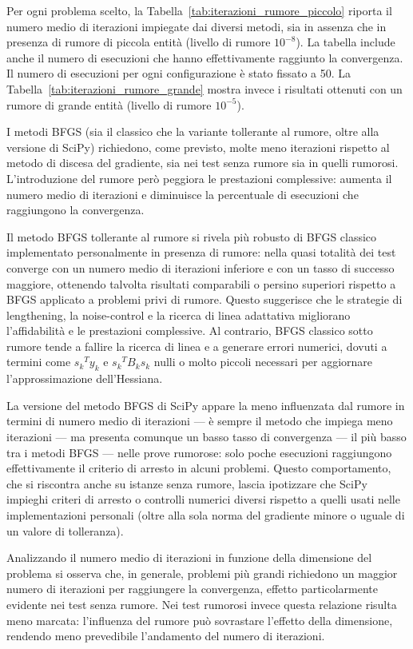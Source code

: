 Per ogni problema scelto, la Tabella~\ref{tab:iterazioni_rumore_piccolo} riporta il numero medio di iterazioni impiegate dai diversi metodi, sia in assenza che in presenza di rumore di piccola entità (livello di rumore \(10^{-8}\)). La tabella include anche il numero di esecuzioni che hanno effettivamente raggiunto la convergenza. Il numero di esecuzioni per ogni configurazione è stato fissato a 50. La Tabella~\ref{tab:iterazioni_rumore_grande} mostra invece i risultati ottenuti con un rumore di grande entità (livello di rumore \(10^{-5}\)).

I metodi BFGS (sia il classico che la variante tollerante al rumore, oltre alla versione di SciPy) richiedono, come previsto, molte meno iterazioni rispetto al metodo di discesa del gradiente, sia nei test senza rumore sia in quelli rumorosi. L’introduzione del rumore però peggiora le prestazioni complessive: aumenta il numero medio di iterazioni e diminuisce la percentuale di esecuzioni che raggiungono la convergenza.

Il metodo BFGS tollerante al rumore si rivela più robusto di BFGS classico implementato personalmente in presenza di rumore: nella quasi totalità dei test converge con un numero medio di iterazioni inferiore e con un tasso di successo maggiore, ottenendo talvolta risultati comparabili o persino superiori rispetto a BFGS applicato a problemi privi di rumore. Questo suggerisce che le strategie di lengthening, la noise-control e la ricerca di linea adattativa migliorano l’affidabilità e le prestazioni complessive. Al contrario, BFGS classico sotto rumore tende a fallire la ricerca di linea e a generare errori numerici, dovuti a termini come \({s_k}^T y_k\) e \({s_k}^T B_k s_k\) nulli o molto piccoli necessari per aggiornare l’approssimazione dell’Hessiana.

La versione del metodo BFGS di SciPy appare la meno influenzata dal rumore in termini di numero medio di iterazioni — è sempre il metodo che impiega meno iterazioni — ma presenta comunque un basso tasso di convergenza — il più basso tra i metodi BFGS — nelle prove rumorose: solo poche esecuzioni raggiungono effettivamente il criterio di arresto in alcuni problemi. Questo comportamento, che si riscontra anche su istanze senza rumore, lascia ipotizzare che SciPy impieghi criteri di arresto o controlli numerici diversi rispetto a quelli usati nelle implementazioni personali (oltre alla sola norma del gradiente minore o uguale di un valore di tolleranza).

Analizzando il numero medio di iterazioni in funzione della dimensione del problema si osserva che, in generale, problemi più grandi richiedono un maggior numero di iterazioni per raggiungere la convergenza, effetto particolarmente evidente nei test senza rumore. Nei test rumorosi invece questa relazione risulta meno marcata: l’influenza del rumore può sovrastare l’effetto della dimensione, rendendo meno prevedibile l’andamento del numero di iterazioni.

